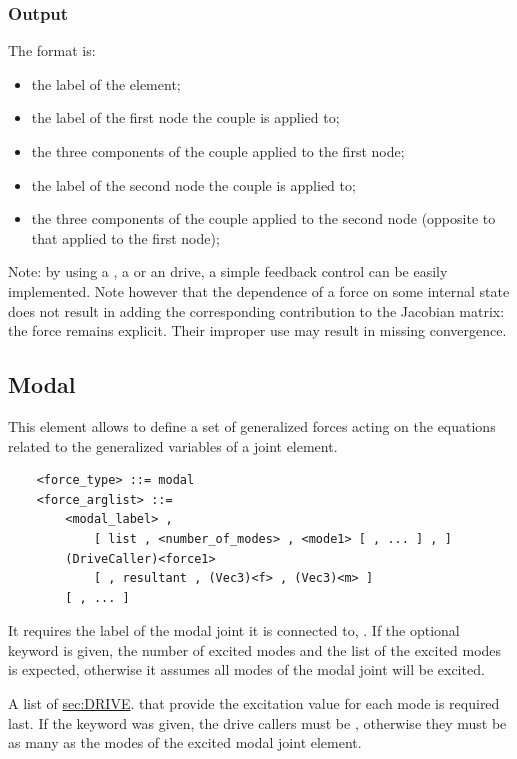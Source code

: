 \subsubsection{Output}
The format is:
\begin{itemize}
    \item the label of the element;
    \item the label of the first node the couple is applied to;
    \item the three components of the couple applied to the first node;
    \item the label of the second node the couple is applied to;
    \item the three components of the couple applied to the second node
	  (opposite to that applied to the first node);
\end{itemize}

\bigskip
Note: by using a , a  or an  drive,
a simple feedback control can be easily implemented.
Note however that the dependence of a force on some internal state
does not result in adding the corresponding contribution 
to the Jacobian matrix: the force remains explicit.
Their improper use may result in missing convergence.

\subsection{Modal}
This element allows to define a set of generalized forces
acting on the equations related to the generalized variables
of a  joint element.
\begin{verbatim}
    <force_type> ::= modal
    <force_arglist> ::=
        <modal_label> ,
            [ list , <number_of_modes> , <mode1> [ , ... ] , ]
        (DriveCaller)<force1>
            [ , resultant , (Vec3)<f> , (Vec3)<m> ]
        [ , ... ]
\end{verbatim}
It requires the label of the modal joint it is connected to,
.
If the optional keyword  is given, the number of excited modes
 and the list of the excited modes is expected,
otherwise it assumes all modes of the  modal joint
will be excited.

A list of
\hyperref{\kw{drive callers}}{\kw{drive callers} (see Section~}{)}{sec:DRIVE}.
that provide the excitation value for each mode is required last.
If the keyword  was given, the drive callers
must be , otherwise they must be as many
as the modes of the excited modal joint element.


